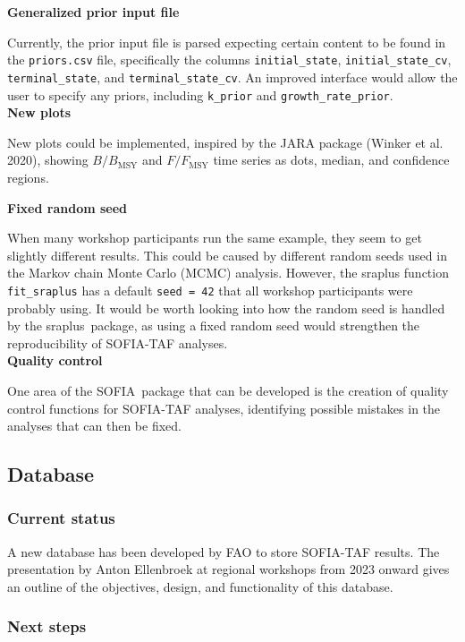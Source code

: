 \documentclass[12pt]{article}
\newcommand\SOFIA{{\sf SOFIA}}
\newcommand\sraplus{{\sf sraplus}}
\begin{document}
\textbf{Generalized prior input file}

Currently, the prior input file is parsed expecting certain content to be found
in the \verb|priors.csv| file, specifically the columns \verb|initial_state|,
\verb|initial_state_cv|, \verb|terminal_state|, and \verb|terminal_state_cv|. An
improved interface would allow the user to specify any priors, including
\verb|k_prior| and \verb|growth_rate_prior|.\\[-2ex]

\textbf{New plots}

New plots could be implemented, inspired by the JARA package (Winker et al.
2020), showing $B/B_\mathrm{MSY}$ and $F/F_\mathrm{MSY}$ time series as dots,
median, and confidence regions.\\[-2ex]

\newpage

\textbf{Fixed random seed}

When many workshop participants run the same example, they seem to get slightly
different results. This could be caused by different random seeds used in the
Markov chain Monte Carlo (MCMC) analysis. However, the sraplus function
\verb|fit_sraplus| has a default \verb|seed = 42| that all workshop participants
were probably using. It would be worth looking into how the random seed is
handled by the \sraplus\ package, as using a fixed random seed would strengthen
the reproducibility of SOFIA-TAF analyses.\\[-2ex]

\textbf{Quality control}

One area of the \SOFIA\ package that can be developed is the creation of quality
control functions for SOFIA-TAF analyses, identifying possible mistakes in the
analyses that can then be fixed.

\subsection{Database}

\subsubsection{Current status}

A new database has been developed by FAO to store SOFIA-TAF results. The
presentation by Anton Ellenbroek at regional workshops from 2023 onward gives an
outline of the objectives, design, and functionality of this database.

\subsubsection{Next steps}
\end{document}
